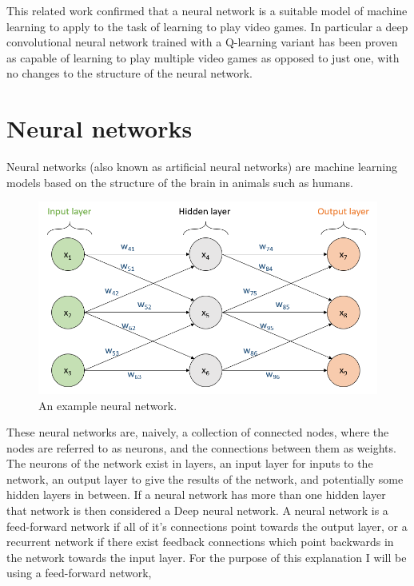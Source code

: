 \documentclass[10pt]{article}
\begin{document}
		This related work confirmed that a neural network is a suitable model of machine learning to apply to the task of learning to play video games. In particular a deep convolutional neural network trained with a Q-learning variant has been proven as capable of learning to play multiple video games as opposed to just one, with no changes to the structure of the neural network.\\
		
	\bigskip
	
	\section{Neural networks}
		Neural networks (also known as artificial neural networks) are machine learning models based on the structure of the brain in animals such as humans.\\
		
		\begin{figure}[h]			
			\includegraphics[scale=0.5]{img/network}
			\centering
			\caption{An example neural network.}
			\label{nnetwork}
		\end{figure}	
		
		These neural networks are, naively, a collection of connected nodes, where the nodes are referred to as neurons, and the connections between them as weights. The neurons of the network exist in layers, an input layer for inputs to the network, an output layer to give the results of the network, and potentially some hidden layers in between. If a neural network has more than one hidden layer that network is then considered a Deep neural network. A neural network is a feed-forward network if all of it's connections point towards the output layer, or a recurrent network if there exist feedback connections which point backwards in the network towards the input layer. For the purpose of this explanation I will be using a feed-forward network,\\
		
\end{document}

